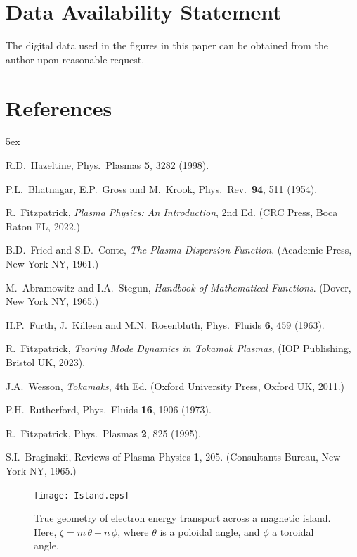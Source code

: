 \documentclass[12pt,prb,aps]{revtex4-1}
\begin{document}
\section*{Data Availability Statement}
The digital data used in the figures in this paper can be obtained from the author upon reasonable request.

\section*{References}
\begin{thebibliography}{99}\baselineskip 5ex

 R.D.~Hazeltine, Phys.\ Plasmas {\bf 5}, 3282 (1998).

 P.L.~Bhatnagar, E.P.~Gross and M.~Krook, Phys.\ Rev.\ {\bf 94}, 511 (1954).

 R.~Fitzpatrick, {\em Plasma Physics: An Introduction}, 2nd Ed. (CRC Press, Boca Raton FL, 2022.)

 B.D.~Fried and S.D.~Conte, {\em The Plasma Dispersion Function}. (Academic Press, New York NY, 1961.)

 M.~Abramowitz and I.A.~Stegun, {\em Handbook of Mathematical Functions}. (Dover, New York NY, 1965.)

 H.P.~Furth,  J.~Killeen and M.N.~Rosenbluth,  Phys.\ Fluids {\bf 6}, 459 (1963).

 R.~Fitzpatrick, {\em Tearing Mode Dynamics in Tokamak Plasmas}, (IOP Publishing, Bristol UK, 2023).

 J.A.~Wesson, {\em Tokamaks}, 4th Ed. (Oxford University Press, Oxford UK, 2011.)

 P.H.~Rutherford, Phys.\ Fluids {\bf 16}, 1906 (1973).

 R.~Fitzpatrick, Phys.\ Plasmas {\bf 2}, 825 (1995).

 S.I.~Braginskii, Reviews of Plasma Physics {\bf 1}, 205.  (Consultants Bureau, New York NY, 1965.)

\end{thebibliography}

\newpage
\begin{figure}
\centerline{\texttt{[image: Island.eps]}}
\caption{True geometry of electron energy transport across a magnetic island. Here, $\zeta= m\,\theta-n\,\phi$, where $\theta$ is a poloidal angle, and $\phi$ a
toroidal angle.  \label{fig1}}
\end{figure}
\end{document}
